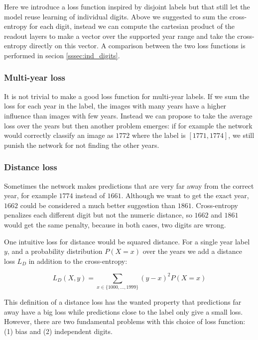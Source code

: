 %

Here we introduce a loss function inspired by disjoint labels but that still let the model reuse learning of individual digits. Above we suggested to sum the cross-entropy for each digit, instead we can compute the cartesian product of the readout layers to make a vector over the supported year range and take the cross-entropy directly on this vector. A comparison between the two loss functions is performed in secion \ref{sssec:ind_digits}.


\subsubsection{Multi-year loss}

It is not trivial to make a good loss function for multi-year labels. If we sum the loss for each year in the label, the images with many years have a higher influence than images with few years. Instead we can propose to take the average loss over the years but then another problem emerges: if for example the network would correctly classify an image as $1772$ where the label is $[1771, 1774]$, we still punish the network for not finding the other years.


\subsubsection{Distance loss}

Sometimes the network makes predictions that are very far away from the correct year, for example $1774$ instead of $1661$. Although we want to get the exact year, $1662$ could be considered a much better suggestion than $1861$. Cross-entropy penalizes each different digit but not the numeric distance, so $1662$ and $1861$ would get the same penalty, because in both cases, two digits are wrong.

One intuitive loss for distance would be squared distance. For a single year label $y$, and a probability distribution $P(X=x)$ over the years we add a distance loss $L_D$ in addition to the cross-entropy:

\[
L_D(X, y) = \sum_{x \in \{1000, \ldots, 1999\}} (y-x)^2 P(X=x)
\]

This definition of a distance loss has the wanted property that predictions far away have a big loss while predictions close to the label only give a small loss. However, there are two fundamental problems with this choice of loss function: (1) bias and (2) independent digits.

